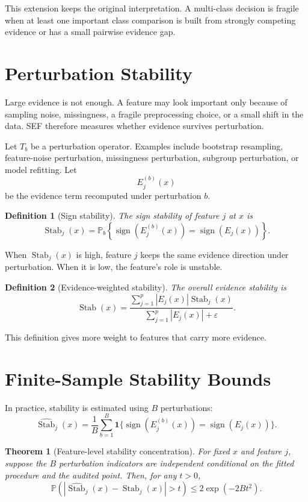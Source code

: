 \documentclass[11pt]{article}
\newtheorem{definition}{Definition}
\newtheorem{theorem}{Theorem}
\newcommand{\Pp}{\mathbb{P}}
\newcommand{\one}{\mathbf{1}}
\newcommand{\sign}{\operatorname{sign}}
\begin{document}
This extension keeps the original interpretation. A multi-class decision is fragile when at least one important class comparison is built from strongly competing evidence or has a small pairwise evidence gap.

\section{Perturbation Stability}

Large evidence is not enough. A feature may look important only because of sampling noise, missingness, a fragile preprocessing choice, or a small shift in the data. SEF therefore measures whether evidence survives perturbation.

Let $T_b$ be a perturbation operator. Examples include bootstrap resampling, feature-noise perturbation, missingness perturbation, subgroup perturbation, or model refitting. Let
\[
E_j^{(b)}(x)
\]
be the evidence term recomputed under perturbation $b$.

\begin{definition}[Sign stability]
The sign stability of feature $j$ at $x$ is
\[
\operatorname{Stab}_j(x)
=
\Pp_b\left\{
\sign(E_j^{(b)}(x))=\sign(E_j(x))
\right\}.
\]
\end{definition}

When $\operatorname{Stab}_j(x)$ is high, feature $j$ keeps the same evidence direction under perturbation. When it is low, the feature's role is unstable.

\begin{definition}[Evidence-weighted stability]
The overall evidence stability is
\[
\operatorname{Stab}(x)
=
\frac{\sum_{j=1}^p |E_j(x)|\operatorname{Stab}_j(x)}
{\sum_{j=1}^p |E_j(x)|+\varepsilon}.
\]
\end{definition}

This definition gives more weight to features that carry more evidence.

\section{Finite-Sample Stability Bounds}

In practice, stability is estimated using $B$ perturbations:
\[
\widehat{\operatorname{Stab}}_j(x)
=
\frac{1}{B}
\sum_{b=1}^B
\one\{\sign(E_j^{(b)}(x))=\sign(E_j(x))\}.
\]

\begin{theorem}[Feature-level stability concentration]
For fixed $x$ and feature $j$, suppose the $B$ perturbation indicators are independent conditional on the fitted procedure and the audited point. Then, for any $t>0$,
\[
\Pp\left(
\left|
\widehat{\operatorname{Stab}}_j(x)
-
\operatorname{Stab}_j(x)
\right|>t
\right)
\leq
2\exp(-2Bt^2).
\]
\end{theorem}
\end{document}

